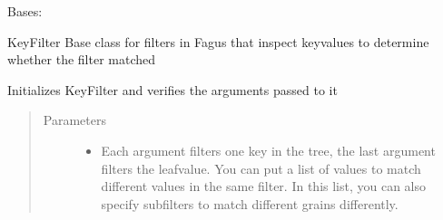 \documentclass[a4paper,10pt,english]{sphinxmanual}
\begin{document}

\begin{fulllineitems}
\label{\detokenize{fagus.filters:fagus.filters.KFil}}
\pysigstartsignatures
{}
\pysigstopsignatures
\sphinxAtStartPar
Bases: {\hyperref[\detokenize{fagus.filters:fagus.filters.FilBase}]{}}

\sphinxAtStartPar
KeyFilter \sphinxhyphen{} Base class for filters in Fagus that inspect key\sphinxhyphen{}values to determine whether the filter matched

\begin{fulllineitems}
\label{\detokenize{fagus.filters:fagus.filters.KFil.__init__}}
\pysigstartsignatures
{}
\pysigstopsignatures
\sphinxAtStartPar
Initializes KeyFilter and verifies the arguments passed to it
\begin{quote}\begin{description}
\item[{Parameters}] \leavevmode\begin{itemize}
\item {}
\sphinxAtStartPar
{} \textendash{} Each argument filters one key in the tree, the last argument filters the leaf\sphinxhyphen{}value. You can
put a list of values to match different values in the same filter. In this list, you can also specify
subfilters to match different grains differently.


\end{itemize}
\end{description}
\end{quote}
\end{fulllineitems}
\end{fulllineitems}
\end{document}
